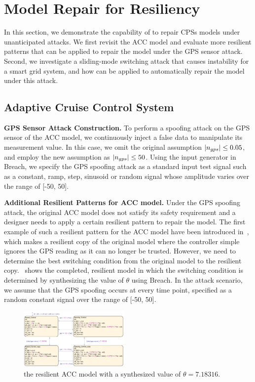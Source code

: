 \section{Model Repair for Resiliency}
%
%
In this section, we demonstrate the capability of \toolreaffirm to repair CPSs models under unanticipated attacks. We first revisit the ACC model and evaluate more resilient patterns that can be applied to repair the model under the GPS sensor attack. Second, we investigate a sliding-mode switching attack that causes instability for a smart grid system, and how \toolreaffirm can be applied to automatically repair the model under this attack.

\subsection{Adaptive Cruise Control System}
{\bf GPS Sensor Attack Construction.} To perform a spoofing attack on the GPS sensor of the ACC model, we continuously inject a false data to manipulate its measurement value. In this case, we omit the original assumption $|n_{gps}| \leq 0.05$, and employ the new assumption as $|n_{gps}| \leq 50$. Using the input generator in Breach, we specify the GPS spoofing attack as a standard input test signal such as a constant, ramp, step, sinusoid or random signal whose amplitude varies over the range of [-50, 50]. 


\vspace{0.5em}
\noindent
{\bf Additional Resilient Patterns for ACC model.} Under the GPS spoofing  attack, the original ACC model does not satisfy its safety requirement and a designer needs to apply a certain resilient pattern to repair the model. The first example of such a resilient pattern for the ACC model have been introduced in~, which makes a resilient copy of the original model where the controller simple ignores the GPS reading as it can no longer be trusted. However, we need to determine the best switching condition from the original model to the resilient copy.~ shows the completed, resilient model in which the switching condition is determined by synthesizing the value of $\theta$ using Breach. In the attack scenario, we assume that the GPS spoofing occurs at every time point, specified as a random constant signal over the range of [-50, 50].   

\begin{figure}[t!]%
	\centering%
    \includegraphics[width=0.48\textwidth]{image/acc_model_pat1}%
	\caption{the resilient ACC model with a synthesized value of $\theta = 7.18316$.}%
\end{figure}%

